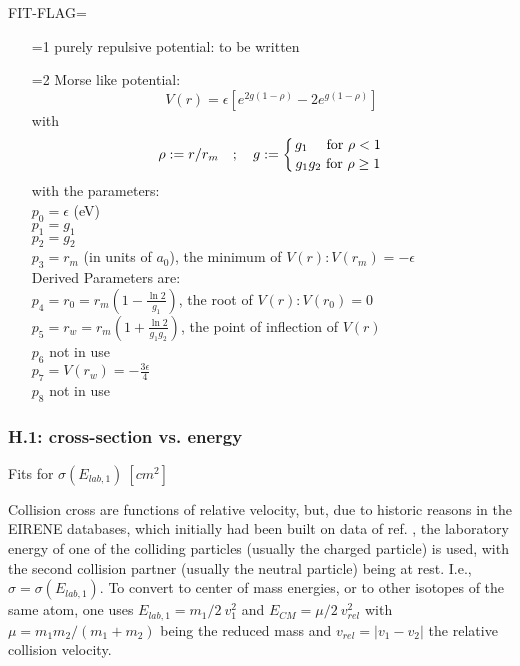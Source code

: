 \documentclass[12pt,dvipdfmx]{article}
\begin{document}
FIT-FLAG=
\begin{itemize}
\item [=1]
purely repulsive potential: to be written
\item [=2]
Morse like potential:\\
\begin{equation}\nonumber
V(r) = \epsilon \left[e^{2g(1-\rho)}-2 e^{g(1-\rho)}\right]
\end{equation}
with
\begin{equation}
 \rho:= r/r_m \quad; \quad g:=\left\{ {g_1  \ \  \ \ \mbox{for} \ \rho < 1 \atop g_1g_2
\ \mbox{for} \
 \rho \geq 1} \right.
\end{equation}
with the parameters:\\  $p_0=\epsilon$ (eV)\\ $p_1=g_1$\\ $p_2=g_2
$\\ $p_3=r_m $ (in units of $a_0$), the minimum of $V(r): V(r_m)=-\epsilon$\\
Derived Parameters are: \\
$p_4=r_0=r_m\left(1-\frac{\ln 2}{g_1}\right)$, the root of $V(r):
V(r_0)=0$\\
$p_5=r_w=r_m\left(1+\frac{\ln 2}{g_1g_2}\right)$, the point of
inflection of $V(r)$\\
$p_6$  not in use\\
$p_7  = V(r_w)=-\frac{3\epsilon}{4}$ \\
$p_8$  not in use
\end{itemize}
\subsubsection{H.1: cross-section vs. energy}\label{sec1.3.1}
Fits for $\sigma  (E_{lab,1}) \ [cm^2]$

Collision cross are functions of relative velocity, but, due to historic reasons
in the EIRENE databases, which initially had been built on data of ref. \cite{kn:Janev}, the laboratory energy  of one of the colliding particles (usually the charged particle)
is used, with the second collision partner (usually the neutral particle) being at rest. I.e., $\sigma= \sigma(E_{lab,1})$.
To convert to center of mass energies, or to other isotopes of the same atom, one uses $E_{lab,1} =m_1/2 \ v_1^2$ and $E_{CM} = \mu/2 \ v_{rel}^2$ with
$\mu = m_1m_2/(m_1+m_2)$ being the reduced mass and $v_{rel}=|v_1-v_2|$ the relative collision velocity.
\end{document}
